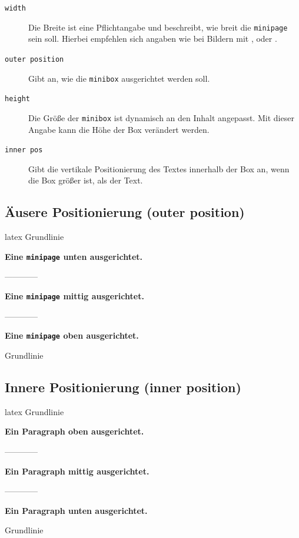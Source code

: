\begin{description}
    \item[\texttt{width}] Die Breite ist eine Pflichtangabe und beschreibt, wie breit die \texttt{minipage} sein soll. Hierbei empfehlen sich angaben wie bei Bildern mit \texttt{\columnwidth}, \texttt{\textwidth} oder \texttt{\linewidth}.
    \item[\texttt{outer position}] Gibt an, wie die \texttt{minibox} ausgerichtet werden soll.
    \item[\texttt{height}] Die Größe der \texttt{minibox} ist dynamisch an den Inhalt angepasst. Mit dieser Angabe kann die Höhe der Box verändert werden.
    \item[\texttt{inner pos}] Gibt die vertikale Positionierung des Textes innerhalb der Box an, wenn die Box größer ist, als der Text.
\end{description}

\subsection{Äusere Positionierung (outer position)}
\begin{showcode}{latex}
    Grundlinie
    \begin{minipage}[b]{0.17\linewidth}
        \textbf{Eine \texttt{minipage} unten ausgerichtet.}
    \end{minipage}
    ------------
    \begin{minipage}{0.17\linewidth}
        \textbf{Eine \texttt{minipage} mittig ausgerichtet.}
    \end{minipage}
    ------------
    \begin{minipage}[t]{0.17\linewidth}
        \textbf{Eine \texttt{minipage} oben ausgerichtet.}
    \end{minipage}
    Grundlinie
\end{showcode}

\subsection{Innere Positionierung (inner position)}
\begin{showcode}{latex}
    Grundlinie
    \begin{minipage}[b][3cm][t]{0.17\linewidth}
        \textbf{Ein Paragraph oben ausgerichtet.}
    \end{minipage}
    ------------
    \begin{minipage}[b][3cm][c]{0.17\linewidth}
        \textbf{Ein Paragraph mittig ausgerichtet.}
    \end{minipage}
    ------------
    \begin{minipage}[b][3cm][b]{0.17\linewidth}
        \textbf{Ein Paragraph unten ausgerichtet.}
    \end{minipage}
    Grundlinie
\end{showcode}